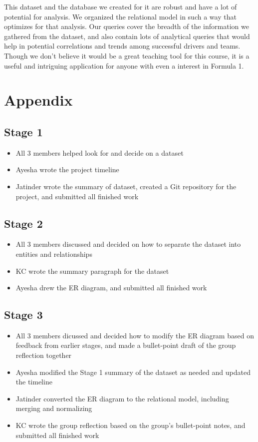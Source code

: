 \documentclass[]{article}
\begin{document}
This dataset and the database we created for it are robust and have a lot of potential for analysis. We organized the relational model in such a way that optimizes for that analysis. Our queries cover the breadth of the information we gathered from the dataset, and also contain lots of analytical queries that would help in potential correlations and trends among successful drivers and teams. Though we don't believe it would be a great teaching tool for this course, it is a useful and intriguing application for anyone with even a interest in Formula 1.

\section{Appendix}

\subsection{Stage 1}
\begin{itemize}
    \item All 3 members helped look for and decide on a dataset
    \item Ayesha wrote the project timeline
    \item Jatinder wrote the summary of dataset, created a Git repository for the project, and submitted all finished work
\end{itemize}

\subsection{Stage 2}
\begin{itemize}
    \item All 3 members discussed and decided on how to separate the dataset into entities and relationships
    \item KC wrote the summary paragraph for the dataset
    \item Ayesha drew the ER diagram, and submitted all finished work
\end{itemize}

\subsection{Stage 3}
\begin{itemize}
    \item All 3 members dicussed and decided how to modify the ER diagram based on feedback from earlier stages, and made a bullet-point draft of the group reflection together
    \item Ayesha modified the Stage 1 summary of the dataset as needed and updated the timeline
    \item Jatinder converted the ER diagram to the relational model, including merging and normalizing
    \item KC wrote the group reflection based on the group's bullet-point notes, and submitted all finished work
\end{itemize}
\end{document}
